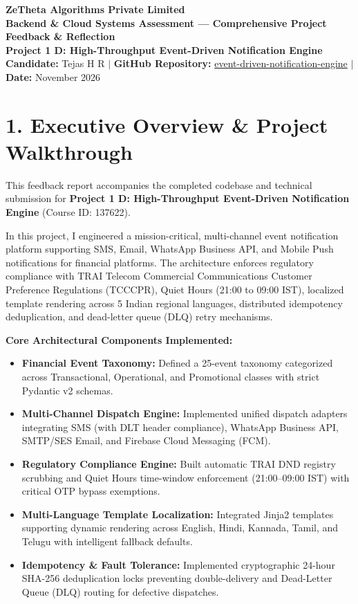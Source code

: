 \documentclass[11pt,a4paper]{article}
\begin{document}
\begin{center}
    {\LARGE \textbf{\color{primary}ZeTheta Algorithms Private Limited}}\\[4pt]
    {\large \textbf{Backend \& Cloud Systems Assessment — Comprehensive Project Feedback \& Reflection}}\\[2pt]
    \textbf{Project 1 D: High-Throughput Event-Driven Notification Engine}\\[3pt]
    \textbf{Candidate:} Tejas H R \quad $|$ \quad \textbf{GitHub Repository:} \href{https://github.com/tejashr0716/event-driven-notification-engine}{event-driven-notification-engine} \quad $|$ \quad \textbf{Date:} November 2026
\end{center}

\vspace{4pt}

\section{1. Executive Overview \& Project Walkthrough}
This feedback report accompanies the completed codebase and technical submission for \textbf{Project 1 D: High-Throughput Event-Driven Notification Engine} (Course ID: 137622).

In this project, I engineered a mission-critical, multi-channel event notification platform supporting SMS, Email, WhatsApp Business API, and Mobile Push notifications for financial platforms. The architecture enforces regulatory compliance with TRAI Telecom Commercial Communications Customer Preference Regulations (TCCCPR), Quiet Hours (21:00 to 09:00 IST), localized template rendering across 5 Indian regional languages, distributed idempotency deduplication, and dead-letter queue (DLQ) retry mechanisms.

\textbf{Core Architectural Components Implemented:}
\begin{itemize}[leftmargin=1.5em, itemsep=2pt]
    \item \textbf{Financial Event Taxonomy:} Defined a 25-event taxonomy categorized across Transactional, Operational, and Promotional classes with strict Pydantic v2 schemas.
    \item \textbf{Multi-Channel Dispatch Engine:} Implemented unified dispatch adapters integrating SMS (with DLT header compliance), WhatsApp Business API, SMTP/SES Email, and Firebase Cloud Messaging (FCM).
    \item \textbf{Regulatory Compliance Engine:} Built automatic TRAI DND registry scrubbing and Quiet Hours time-window enforcement (21:00–09:00 IST) with critical OTP bypass exemptions.
    \item \textbf{Multi-Language Template Localization:} Integrated Jinja2 templates supporting dynamic rendering across English, Hindi, Kannada, Tamil, and Telugu with intelligent fallback defaults.
    \item \textbf{Idempotency \& Fault Tolerance:} Implemented cryptographic 24-hour SHA-256 deduplication locks preventing double-delivery and Dead-Letter Queue (DLQ) routing for defective dispatches.
\end{itemize}
\end{document}
